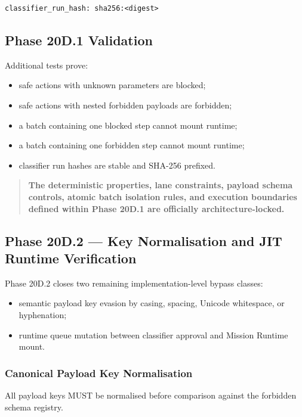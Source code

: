 \begin{verbatim}
classifier_run_hash: sha256:<digest>
\end{verbatim}

\subsection{Phase 20D.1 Validation}

Additional tests prove:

\begin{itemize}
  \item safe actions with unknown parameters are blocked;
  \item safe actions with nested forbidden payloads are forbidden;
  \item a batch containing one blocked step cannot mount runtime;
  \item a batch containing one forbidden step cannot mount runtime;
  \item classifier run hashes are stable and SHA-256 prefixed.
\end{itemize}

\begin{quote}
\textbf{The deterministic properties, lane constraints, payload schema controls, atomic batch isolation rules, and execution boundaries defined within Phase 20D.1 are officially architecture-locked.}
\end{quote}

\subsection{Phase 20D.2 --- Key Normalisation and JIT Runtime Verification}

Phase 20D.2 closes two remaining implementation-level bypass classes:

\begin{itemize}
  \item semantic payload key evasion by casing, spacing, Unicode whitespace, or hyphenation;
  \item runtime queue mutation between classifier approval and Mission Runtime mount.
\end{itemize}

\subsubsection{Canonical Payload Key Normalisation}

All payload keys MUST be normalised before comparison against the forbidden schema registry.

